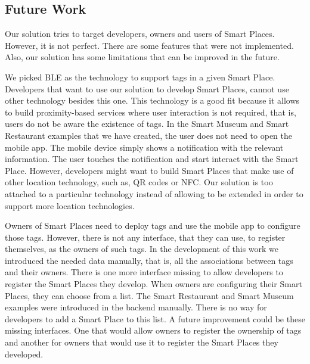 \subsection{Future Work}
\label{sec:conclusion_future_work}
Our solution tries to target developers, owners and users of Smart Places.
However, it is not perfect.
There are some features that were not implemented. Also, our solution has some limitations that can be improved in the future.

We picked \gls{BLE} as the technology to support tags in a given Smart Place.
Developers that want to use our solution to develop Smart Places, cannot use other technology besides this one.
This technology is a good fit because it allows to build proximity-based services where user interaction is not required, that is, users do not be aware the existence of tags.
In the Smart Museum and Smart Restaurant examples that we have created, the user does not need to open the mobile app.
The mobile device simply shows a notification with the relevant information. The user touches the notification and start interact with the Smart Place.
However, developers might want to build Smart Places that make use of other location technology, such as, \gls{QR} codes or \gls{NFC}.
Our solution is too attached to a particular technology instead of allowing to be extended in order to support more location technologies.

Owners of Smart Places need to deploy tags and use the mobile app to configure those tags.
However, there is not any interface, that they can use, to register themselves, as the owners of such tags.
In the development of this work we introduced the needed data manually, that is,
all the associations between tags and their owners.
There is one more interface missing to allow developers to register the Smart Places they develop.
When owners are configuring their Smart Places, they can choose from a list.
The Smart Restaurant and Smart Museum examples were introduced in the backend manually.
There is no way for developers to add a Smart Place to this list.
A future improvement could be these missing interfaces.
One that would allow owners to register the ownership of tags and another for owners that would use it to register the Smart Places they developed.


